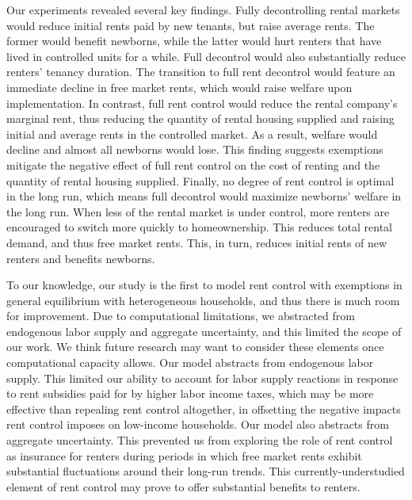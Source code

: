 \documentclass[parskip=full]{article}
\begin{document}
Our experiments revealed several key findings. Fully decontrolling rental markets would reduce initial rents paid by new tenants, but raise average rents. The former would benefit newborns, while the latter would hurt renters that have lived in controlled units for a while. Full decontrol would also substantially reduce renters' tenancy duration. The transition to full rent decontrol would feature an immediate decline in free market rents, which would raise welfare upon implementation. In contrast, full rent control would reduce the rental company's marginal rent, thus reducing the quantity of rental housing supplied and raising initial and average rents in the controlled market. As a result, welfare would decline and almost all newborns would lose. This finding suggests exemptions mitigate the negative effect of full rent control on the cost of renting and the quantity of rental housing supplied. Finally, no degree of rent control is optimal in the long run, which means full decontrol would maximize newborns' welfare in the long run. When less of the rental market is under control, more renters are encouraged to switch more quickly to homeownership. This reduces total rental demand, and thus free market rents. This, in turn, reduces initial rents of new renters and benefits newborns.

To our knowledge, our study is the first to model rent control with exemptions in general equilibrium with heterogeneous households, and thus there is much room for improvement. Due to computational limitations, we abstracted from endogenous labor supply and aggregate uncertainty, and this limited the scope of our work. We think future research may want to consider these elements once computational capacity allows. Our model abstracts from endogenous labor supply. This limited our ability to account for labor supply reactions in response to rent subsidies paid for by higher labor income taxes, which may be more effective than repealing rent control altogether, in offsetting the negative impacts rent control imposes on low-income households. Our model also abstracts from aggregate uncertainty. This prevented us from exploring the role of rent control as insurance for renters during periods in which free market rents exhibit substantial fluctuations around their long-run trends. This currently-understudied element of rent control may prove to offer substantial benefits to renters.




\vspace{1cm}
\end{document}
